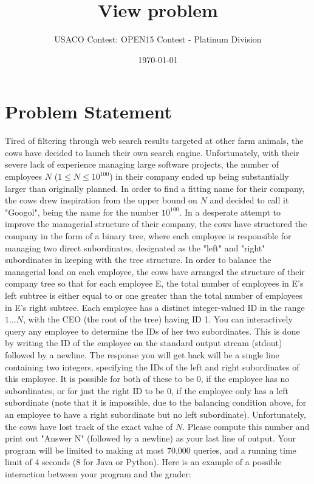 \documentclass[12pt]{article}
\title{View problem}
\author{USACO Contest: OPEN15 Contest - Platinum Division}
\date{\today}
\begin{document}
\maketitle

\section*{Problem Statement}

Tired of filtering through web search results targeted at other farm animals, 
the cows have decided to launch their own search engine.  Unfortunately, with
their severe lack of experience managing large software projects, the number
of employees $N$ ($1 \le N \le 10^{100}$) in their company ended up being
substantially larger than originally planned.  In order to find a fitting name
for their company, the cows drew inspiration from the upper bound on $N$ and
decided to call it "Googol", being the name for the number $10^{100}$.
In a desperate attempt to improve the managerial structure of their company,
the cows have structured the company in the form of a binary tree, where each
employee is responsible for managing two direct subordinates, designated as the
"left" and "right" subordinates in keeping with the tree structure.  In
order to balance the managerial load on each employee, the cows have arranged
the structure of their company tree so that for each employee E, the
total number of employees in E's left subtree is either equal to or one greater 
than the total number of employees in E's right subtree.
Each employee has a distinct integer-valued ID in the range $1\ldots
N$, with the CEO (the root of the tree) having ID 1.  You can interactively
query any employee to determine the IDs of her two subordinates.  This is done
by writing the ID of the employee on the standard output stream (stdout)
followed by a newline. The response you will get back will be a single line
containing two integers, specifying the IDs of the left and right subordinates
of this employee.  It is possible for both of these to be 0, if the employee has
no subordinates, or for just the right ID to be 0, if the employee only has a
left subordinate (note that it is impossible, due to the balancing condition
above, for an employee to have a right subordinate but no left subordinate).
Unfortunately, the cows have lost track of the exact value of $N$.  Please 
compute this number and print out "Answer N" (followed by a newline) as your 
last line of output.  Your program will be limited to making at most 70,000 queries,
and a running time limit of 4 seconds (8 for Java or Python).
Here is an example of a possible interaction between your program and the
grader:
\end{document}
